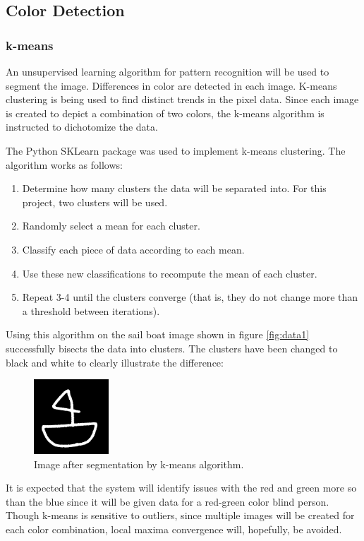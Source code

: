 \documentclass[12pt]{article}
\begin{document}
\subsection{Color Detection}
\subsubsection{k-means}
An unsupervised learning algorithm for pattern recognition will be used to segment the image. Differences in color are detected in each image. K-means clustering \cite{kmeans} is being used to find distinct trends in the pixel data. Since each image is created to depict a combination of two colors, the k-means algorithm is instructed to dichotomize the data.

The Python SKLearn package was used to implement k-means clustering. The algorithm works as follows:
\singlespacing
\begin{enumerate}
\item Determine how many clusters the data will be separated into. For this project, two clusters will be used.
\item Randomly select a mean for each cluster.
\item Classify each piece of data according to each mean.
\item Use these new classifications to recompute the mean of each cluster.
\item Repeat 3-4 until the clusters converge (that is, they do not change more than a threshold between iterations).
\end{enumerate}
\doublespacing
Using this algorithm on the sail boat image shown in figure \ref{fig:data1} successfully bisects the data into clusters. The clusters have been changed to black and white to clearly illustrate the difference:

\begin{figure}[H]
	\centering
	\includegraphics[width=0.25\textwidth]{img/data2_bw.png}
	\caption{Image after segmentation by k-means algorithm.}
	\label{fig:kmeans1}
\end{figure}

It is expected that the system will identify issues with the red and green more so than the blue since it will be given data for a red-green color blind person. Though k-means is sensitive to outliers, since multiple images will be created for each color combination, local maxima convergence will, hopefully, be avoided. 
\end{document}
